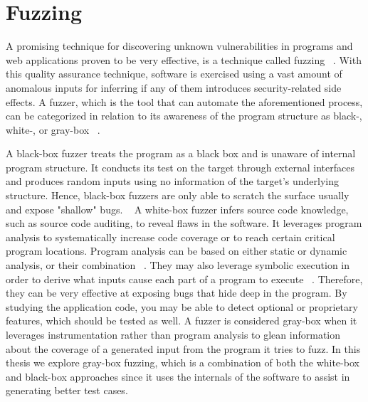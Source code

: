 \section{Fuzzing}
A promising technique for discovering unknown vulnerabilities in
programs and web applications proven to be very effective, is a technique called fuzzing ~\cite{fuzzing_def}.
With this quality assurance technique, software is exercised using a vast amount of anomalous inputs for inferring if any of them introduces security-related side effects. A fuzzer, which is the tool that can automate the aforementioned process, can be categorized in relation to its awareness of the program structure as black-, white-, or gray-box ~\cite{fuzzing_book}. 

A black-box fuzzer treats the program as a black box and is unaware of
internal program structure. It conducts its test on the target through external
interfaces and produces random inputs using no information of the target's underlying structure. Hence,  black-box fuzzers are only able to scratch the surface usually and expose "shallow" bugs. ~\cite{fuzzing_owasp}
A white-box fuzzer infers source code knowledge, such as source code auditing, to reveal
flaws in the software. It leverages program analysis to systematically
increase code coverage or to reach certain critical program locations. Program analysis can be based on either static or dynamic analysis, or their combination ~\cite{program_analysis_book}. They may also leverage symbolic execution in order to derive what inputs cause each part of a program to execute ~\cite{symbolic_exe}. Therefore, they can be very effective at exposing bugs that hide deep in the program. By studying the application code, you may be able to detect optional or proprietary features, which should be tested as well.
A fuzzer is considered gray-box when it leverages instrumentation rather than program analysis to glean information about the coverage of a generated input from the program it tries to fuzz. In this thesis we explore gray-box fuzzing, which is a combination of both the white-box and black-box approaches since it uses the internals of the software to assist in generating better test cases.

